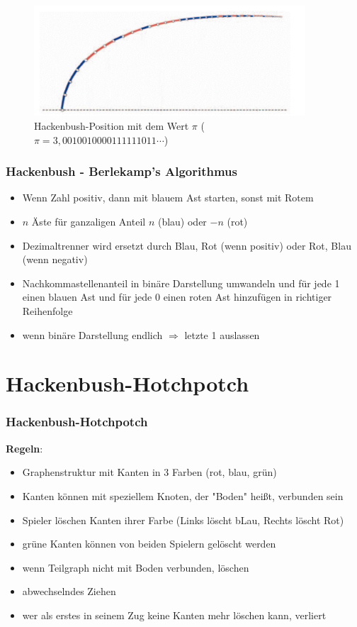 \documentclass[12pt, aspectratio=169]{beamer}
\begin{document}
\begin{frame}
    \begin{figure}
        \includegraphics[width=0.9\textwidth]{pic/hackenbush-pi.png}
        \caption{Hackenbush-Position mit dem Wert $\pi$ ($\pi = 3,0010010000111111011\cdots$) \tiny{\cite{ww}}}
    \end{figure}
\end{frame}

\begin{frame}
    \frametitle{Hackenbush - Berlekamp's Algorithmus}
    \begin{itemize}
        \item Wenn Zahl positiv, dann mit blauem Ast starten, sonst mit Rotem
        \item $n$ Äste für ganzaligen Anteil $n$ (blau) oder $-n$ (rot)
        \item Dezimaltrenner wird ersetzt durch Blau, Rot (wenn positiv) oder Rot, Blau (wenn negativ)
        \item Nachkommastellenanteil in binäre Darstellung umwandeln und für jede 1 einen blauen Ast und für jede 0 einen roten Ast hinzufügen in richtiger Reihenfolge
        \item wenn binäre Darstellung endlich $\Rightarrow$ letzte 1 auslassen
    \end{itemize}
\end{frame}

\section{Hackenbush-Hotchpotch}
\begin{frame}
    \frametitle{Hackenbush-Hotchpotch}
\textbf{Regeln}:
    \begin{itemize}
        \item Graphenstruktur mit Kanten in \alert{3} Farben (rot, blau, \alert{grün})
        \item Kanten können mit speziellem Knoten, der "Boden" heißt, verbunden sein
        \item Spieler löschen Kanten ihrer Farbe (Links löscht bLau, Rechts löscht Rot)
        \item \alert{grüne Kanten können von beiden Spielern gelöscht werden}
        \item wenn Teilgraph nicht mit Boden verbunden, löschen
        \item abwechselndes Ziehen
        \item wer als erstes in seinem Zug keine Kanten mehr löschen kann, verliert
    \end{itemize}
\end{frame}
\end{document}
